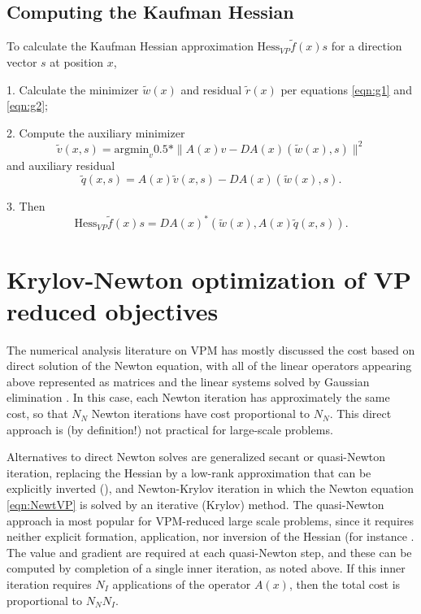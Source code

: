 \subsection{Computing the Kaufman Hessian}

To calculate the Kaufman Hessian approximation $\mbox{Hess}_{VP}\tilde{f}(x)s$ for a direction vector $s$ at position $x$,

1. Calculate the minimizer $\tilde{w}(x)$ and residual $\tilde{r}(x)$ per equations \ref{eqn:g1} and \ref{eqn:g2};

2. Compute the auxiliary minimizer
\begin{equation}
  \label{eqn:h1}
\tilde{v}(x,s) = \mbox{argmin}_v 0.5*\|A(x)v-DA(x)(\tilde{w}(x),s)\|^2
\end{equation}
and auxiliary residual
\begin{equation}
  \label{eqn:h2}
  \tilde{q}(x,s) = A(x)\tilde{v}(x,s) - DA(x)(\tilde{w}(x),s).
\end{equation}

3. Then
\begin{equation}
  \label{eqn:h3}
  \mbox{Hess}_{VP}\tilde{f}(x)s = DA(x)^*(\tilde{w}(x),A(x)\tilde{q}(x,s)).
\end{equation}

\section{Krylov-Newton optimization of VP reduced objectives}
The numerical analysis literature on VPM has mostly discussed the cost based on direct solution of the Newton equation, with all of the linear operators appearing above represented as matrices and the linear systems solved by Gaussian elimination \cite[]{Kaufman:75,GolubPereyra:03}. In this case, each Newton iteration has approximately the same cost, so that $N_N$ Newton iterations have cost proportional to $N_N$. This direct approach is (by definition!) not practical for large-scale problems.

Alternatives to direct Newton solves are generalized secant or quasi-Newton iteration, replacing the Hessian by a low-rank approximation that can be explicitly inverted (\cite[]{NocedalWright}), and Newton-Krylov iteration in which the Newton equation \ref{eqn:NewtVP} is solved by an iterative (Krylov) method. The quasi-Newton approach ia most popular for VPM-reduced large scale problems, since it requires neither explicit formation, application, nor inversion of the Hessian (for instance \cite{Warner:16}. The value and gradient are required at each quasi-Newton step, and these can be computed by completion of a single inner iteration, as noted above. If this inner iteration requires $N_I$ applications of the operator $A(x)$, then the total cost is proportional to $N_NN_I$.

